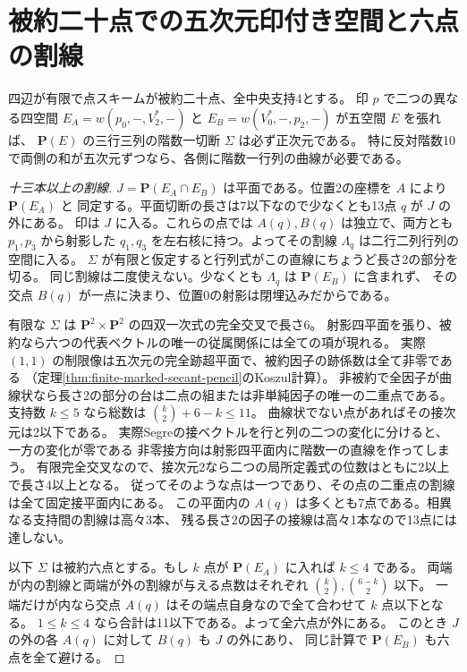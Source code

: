 \section{被約二十点での五次元印付き空間と六点の割線}
\label{sec:finite-marked-five-space-secants}
\begin{theorem}\label{thm:finite-marked-five-space-secants}
四辺が有限で点スキームが被約二十点、全中央支持4とする。
印 $p$ で二つの異なる四空間 $E_A=w(p_0,-,V_2^*,-)$ と
$E_B=w(V_0^*,-,p_2,-)$ が五空間 $E$ を張れば、
$\mathbf P(E)$ の三行三列の階数一切断 $\Sigma$ は必ず正次元である。
特に反対階数10で両側の和が五次元ずつなら、各側に階数一行列の曲線が必要である。
\end{theorem}
\begin{proof}[十三本以上の割線]
$J=\mathbf P(E_A\cap E_B)$ は平面である。位置2の座標を $A$ により $\mathbf P(E_A)$ と
同定する。平面切断の長さは7以下なので少なくとも13点 $q$ が $J$ の外にある。
印は $J$ に入る。これらの点では $A(q),B(q)$ は独立で、両方とも $p_1,p_3$ から射影した
$q_1,q_3$ を左右核に持つ。よってその割線 $\Lambda_q$ は二行二列行列の空間に入る。
$\Sigma$ が有限と仮定すると行列式がこの直線にちょうど長さ2の部分を切る。
同じ割線は二度使えない。少なくとも $\Lambda_q$ は $\mathbf P(E_B)$ に含まれず、
その交点 $B(q)$ が一点に決まり、位置0の射影は閉埋込みだからである。

有限な $\Sigma$ は $\mathbf P^2\times\mathbf P^2$ の四双一次式の完全交叉で長さ6。
射影四平面を張り、被約なら六つの代表ベクトルの唯一の従属関係には全ての項が現れる。
実際 $(1,1)$ の制限像は五次元の完全跡超平面で、被約因子の跡係数は全て非零である
（定理\ref{thm:finite-marked-secant-pencil}のKoszul計算）。
非被約で全因子が曲線状なら長さ2の部分の台は二点の組または非単純因子の唯一の二重点である。
支持数 $k\le5$ なら総数は $\binom{k}{2}+6-k\le11$。
曲線状でない点があればその接次元は2以下である。
実際Segreの接ベクトルを行と列の二つの変化に分けると、一方の変化が零である
非零接方向は射影四平面内に階数一の直線を作ってしまう。
有限完全交叉なので、接次元2なら二つの局所定義式の位数はともに2以上で長さ4以上となる。
従ってそのような点は一つであり、その点の二重点の割線は全て固定接平面内にある。
この平面内の $A(q)$ は多くとも7点である。相異なる支持間の割線は高々3本、
残る長さ2の因子の接線は高々1本なので13点には達しない。

以下 $\Sigma$ は被約六点とする。もし $k$ 点が $\mathbf P(E_A)$ に入れば $k\le4$ である。
両端が内の割線と両端が外の割線が与える点数はそれぞれ $\binom{k}{2},\binom{6-k}{2}$ 以下。
一端だけが内なら交点 $A(q)$ はその端点自身なので全て合わせて $k$ 点以下となる。
$1\le k\le4$ なら合計は11以下である。よって全六点が外にある。
このとき $J$ の外の各 $A(q)$ に対して $B(q)$ も $J$ の外にあり、
同じ計算で $\mathbf P(E_B)$ も六点を全て避ける。

\end{proof}
